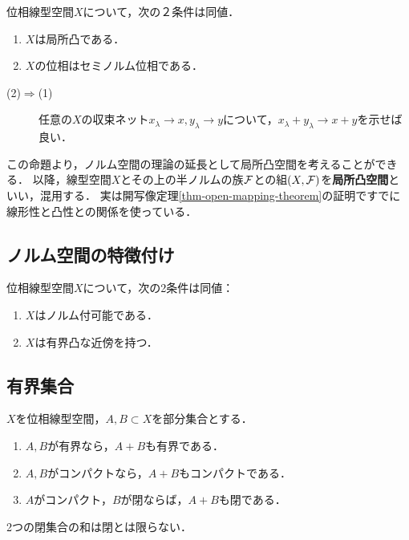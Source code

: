 \documentclass[uplatex,dvipdfmx]{jsreport}
\begin{document}
\begin{proposition}[局所凸性の特徴付け]\label{prop-characterization-of-locally-convex-spaces}
    位相線型空間$X$について，次の２条件は同値．
    \begin{enumerate}
        \item $X$は局所凸である．
        \item $X$の位相はセミノルム位相である．
    \end{enumerate}
\end{proposition}
\begin{Proof}\mbox{}
    \begin{description}
        \item[(2)$\Rightarrow$(1)] 任意の$X$の収束ネット$x_\lambda\to x,y_\lambda\to y$について，$x_\lambda+y_\lambda\to x+y$を示せば良い．
    \end{description}
\end{Proof}
\begin{remarks}
    この命題より，ノルム空間の理論の延長として局所凸空間を考えることができる．
    以降，線型空間$X$とその上の半ノルムの族$\mathcal{F}$との組$(X,\mathcal{F})$を\textbf{局所凸空間}といい，混用する．
    実は開写像定理\ref{thm-open-mapping-theorem}の証明ですでに線形性と凸性との関係を使っている．
\end{remarks}

\subsection{ノルム空間の特徴付け}

\begin{theorem}
    位相線型空間$X$について，次の2条件は同値：
    \begin{enumerate}
        \item $X$はノルム付可能である．
        \item $X$は有界凸な近傍を持つ．
    \end{enumerate}
\end{theorem}

\subsection{有界集合}

\begin{proposition}
    $X$を位相線型空間，$A,B\subset X$を部分集合とする．
    \begin{enumerate}
        \item $A,B$が有界なら，$A+B$も有界である．
        \item $A,B$がコンパクトなら，$A+B$もコンパクトである．
        \item $A$がコンパクト，$B$が閉ならば，$A+B$も閉である．
    \end{enumerate}
    2つの閉集合の和は閉とは限らない．
\end{proposition}
\end{document}
